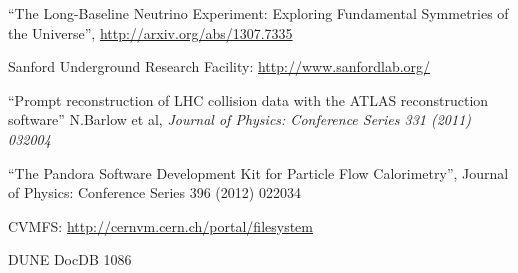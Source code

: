 \documentclass[12pt]{article}
\begin{document}
\newpage


\begin{thebibliography}{99}

 ``The Long-Baseline Neutrino Experiment: Exploring Fundamental Symmetries of the Universe'',  \url{http://arxiv.org/abs/1307.7335}


 Sanford Underground Research Facility: \url{http://www.sanfordlab.org/}



 ``Prompt reconstruction of LHC collision data with the ATLAS reconstruction software'' N.Barlow et al, \textit{Journal of Physics: Conference Series 331 (2011) 032004}

 ``The Pandora Software Development Kit for Particle Flow Calorimetry'', Journal of Physics: Conference Series 396 (2012) 022034


 CVMFS: \url{http://cernvm.cern.ch/portal/filesystem}

 DUNE DocDB 1086 %

\end{thebibliography}
\end{document}
